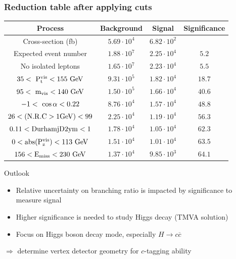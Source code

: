 \documentclass{beamer}
\begin{document}
\begin{frame}
    \frametitle{Reduction table after applying cuts}

    \centering 
    \footnotesize{ 
                \begin{tabular}{c c c c}
      \hline
      Process                                     & Background          & Signal              & Significance  \tabularnewline
      \hline
      \hline
      Cross-section (fb)                          & $5.69 \cdot 10^{4}$ & $6.82 \cdot 10^{2}$ &               \tabularnewline
      \hline
      Expected event number                       & $1.88 \cdot 10^{7}$ & $2.25 \cdot 10^{4}$ & $5.2$         \tabularnewline
      No isolated leptons                         & $1.65 \cdot 10^{7}$ & $2.23 \cdot 10^{4}$ & $5.5$         \tabularnewline
      {$35 <~\rm{{P}_{t}^{vis}} < 155~\rm{GeV} $} & $9.31 \cdot 10^{5}$ & $1.82 \cdot 10^{4}$ & $18.7$        \tabularnewline
      {$95 <~\rm{m_{vis}}< 140~\rm{GeV}$}         & $1.50 \cdot 10^{5}$ & $1.66 \cdot 10^{4}$ & $40.6$        \tabularnewline
      {$-1 <~\rm{\cos{\alpha}}< 0.22$}            & $8.76 \cdot 10^{4}$ & $1.57 \cdot 10^{4}$ & $48.8$        \tabularnewline
      $26 < (\rm{N.R.C > 1GeV}) < 99$             & $2.25 \cdot 10^{4}$ & $1.19 \cdot 10^{4}$ & $56.3$        \tabularnewline
      $0.11 < \rm{DurhamjD2ym} < 1$               & $1.78 \cdot 10^{4}$ & $1.05 \cdot 10^{4}$ & $62.3$        \tabularnewline
      $0 < \rm{abs(P_{z}^{vis})} < 113~\rm{GeV}$& $1.51 \cdot 10^{4}$ & $1.01 \cdot 10^{4}$ & $63.5$        \tabularnewline
      $156 < \rm{E_{miss}} < 230~\rm{GeV}$   & $1.37 \cdot 10^{4}$ & $9.85 \cdot 10^{3}$ & $64.1$        \tabularnewline      
      \hline %
    \end{tabular}
   }
   \vspace{-0.15cm}
   \begin{block}{Outlook}
     \begin{itemize}
       \item Relative uncertainty on branching ratio is impacted by significance to measure signal
       \item Higher significance is needed to study Higgs decay (TMVA solution)
       \item Focus on Higgs boson decay mode, especially $H \rightarrow c \overline{c}$ 
     \end{itemize}
     \vspace{-0.2cm}
     \centering
     $\Rightarrow$ determine vertex detector geometry for $c$-tagging ability 
   \end{block}
\end{frame}
\end{document}
